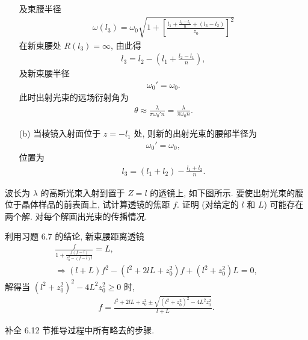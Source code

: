 \documentclass{note}
\begin{document}
\begin{sol}
\begin{itemize}
\begin{align}
        \end{align}
        及束腰半径
        \begin{align}
            \omega(l_3)=\omega_0\sqrt{1+\left[\frac{l_1+\frac{l_2-l_1}{n}+(l_3-l_2)}{z_0}\right]^2}
        \end{align}
        在新束腰处 $R(l_3)=\infty$, 由此得
        \begin{align}
            l_3=l_2-\left(l_1+\frac{l_2-l_1}{n}\right),
        \end{align}
        及新束腰半径
        \begin{align}
            \omega_0'=\omega_0.
        \end{align}
        此时出射光束的远场衍射角为
        \begin{align}
            \theta\approx\frac{\lambda}{\pi\omega_0'n}=\frac{\lambda}{\pi\omega_0n}.
        \end{align}
        \item[(b)] 当棱镜入射面位于 $z=-l_1$ 处, 则新的出射光束的腰部半径为
        \begin{align}
            \omega_0'=\omega_0,
        \end{align}
        位置为
        \begin{align}
            l_3=(l_1+l_2)-\frac{l_1+l_2}{n}.
        \end{align}
    \end{itemize}
\end{sol}

\begin{exe}
    波长为 $\lambda$ 的高斯光束入射到置于 $Z=l$ 的透镜上, 如下图所示.
    要使出射光束的腰位于晶体样品的前表面上, 试计算透镜的焦距 $f$. 证明 (对给定的 $l$ 和 $L$) 可能存在两个解. 对每个解画出光束的传播情况.
\end{exe}
\begin{pf}
    利用习题 6.7  的结论, 新束腰距离透镜
    \begin{gather}
        \frac{f}{1+\frac{f(f-l)}{z_0^2-(f-l)l}}=L,\\
        \Longrightarrow(l+L)f^2-(l^2+2lL+z_0^2)f+(l^2+z_0^2)L=0,
    \end{gather}
    解得当 $(l^2+z_0^2)^2-4L^2z_0^2\geq 0$ 时,
    \begin{align}
        f=\frac{l^2+2lL+z_0^2\pm\sqrt{(l^2+z_0^2)^2-4L^2z_0^2}}{l+L}.
    \end{align}
\end{pf}

\begin{exe}
    补全 6.12 节推导过程中所有略去的步骤.
\end{exe}
\begin{pf}
    
\end{pf}
\end{document}
